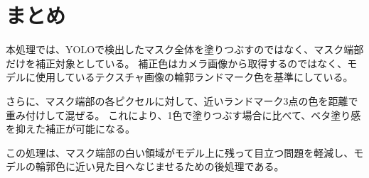 \documentclass[uplatex,dvipdfmx]{jsarticle}
\begin{document}
\section{まとめ}

本処理では、YOLOで検出したマスク全体を塗りつぶすのではなく、マスク端部だけを補正対象としている。
補正色はカメラ画像から取得するのではなく、モデルに使用しているテクスチャ画像の輪郭ランドマーク色を基準にしている。

さらに、マスク端部の各ピクセルに対して、近いランドマーク3点の色を距離で重み付けして混ぜる。
これにより、1色で塗りつぶす場合に比べて、ベタ塗り感を抑えた補正が可能になる。

この処理は、マスク端部の白い領域がモデル上に残って目立つ問題を軽減し、モデルの輪郭色に近い見た目へなじませるための後処理である。
\end{document}
